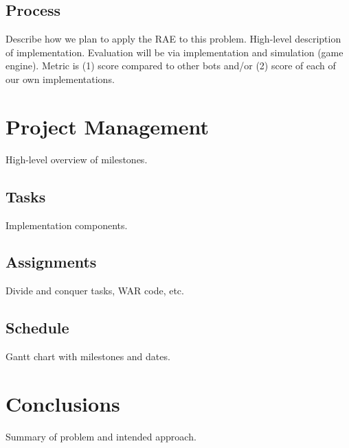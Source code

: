 \documentclass[a4paper,11pt]{article}
\begin{document}
\subsection{Process}\label{sec:process}
Describe how we plan to apply the RAE to this problem. 
High-level description of implementation. 
Evaluation will be via implementation and simulation (game engine).
Metric is (1) score compared to other bots and/or (2) score of each of our own implementations.

%
\section{Project Management}\label{sec:management}
High-level overview of milestones.

\subsection{Tasks}\label{sec:tasks}
Implementation components.

\subsection{Assignments}\label{sec:assignments}
Divide and conquer tasks, WAR code, etc.

\subsection{Schedule}\label{sec:schedule}
Gantt chart with milestones and dates.

%
\section{Conclusions}\label{sec:conclusions}
Summary of problem and intended approach.

%
%

\end{document}
